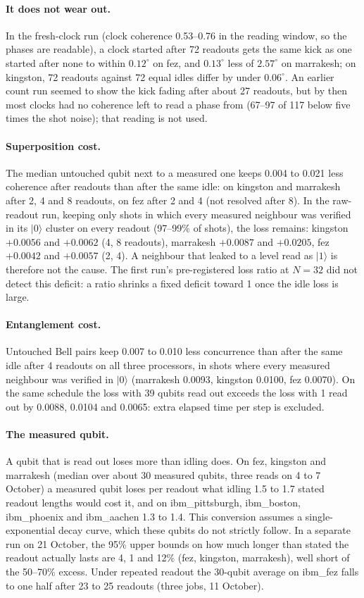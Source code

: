 \documentclass[reprint,amsmath,amssymb,aps,superscriptaddress,nofootinbib]{revtex4-2}
\begin{document}
\paragraph*{It does not wear out.} In the fresh-clock run (clock coherence 0.53--0.76 in the reading window, so the phases are readable), a clock started after 72 readouts gets the same kick as one started after none to within $0.12^\circ$ on fez, and $0.13^\circ$ less of $2.57^\circ$ on marrakesh; on kingston, 72 readouts against 72 equal idles differ by under $0.06^\circ$. An earlier count run seemed to show the kick fading after about 27 readouts, but by then most clocks had no coherence left to read a phase from (67--97 of 117 below five times the shot noise); that reading is not used.

\paragraph*{Superposition cost.} The median untouched qubit next to a measured one keeps 0.004 to 0.021 less coherence after readouts than after the same idle: on kingston and marrakesh after 2, 4 and 8 readouts, on fez after 2 and 4 (not resolved after 8). In the raw-readout run, keeping only shots in which every measured neighbour was verified in its $|0\rangle$ cluster on every readout (97--99\% of shots), the loss remains: kingston $+0.0056$ and $+0.0062$ (4, 8 readouts), marrakesh $+0.0087$ and $+0.0205$, fez $+0.0042$ and $+0.0057$ (2, 4). A neighbour that leaked to a level read as $|1\rangle$ is therefore not the cause. The first run's pre-registered loss ratio at $N=32$ did not detect this deficit: a ratio shrinks a fixed deficit toward 1 once the idle loss is large.

\paragraph*{Entanglement cost.} Untouched Bell pairs keep 0.007 to 0.010 less concurrence than after the same idle after 4 readouts on all three processors, in shots where every measured neighbour was verified in $|0\rangle$ (marrakesh 0.0093, kingston 0.0100, fez 0.0070). On the same schedule the loss with 39 qubits read out exceeds the loss with 1 read out by 0.0088, 0.0104 and 0.0065: extra elapsed time per step is excluded.

\paragraph*{The measured qubit.} A qubit that is read out loses more than idling does. On fez, kingston and marrakesh (median over about 30 measured qubits, three reads on 4 to 7 October) a measured qubit loses per readout what idling 1.5 to 1.7 stated readout lengths would cost it, and on ibm\_pittsburgh, ibm\_boston, ibm\_phoenix and ibm\_aachen 1.3 to 1.4. This conversion assumes a single-exponential decay curve, which these qubits do not strictly follow. In a separate run on 21 October, the 95\% upper bounds on how much longer than stated the readout actually lasts are 4, 1 and 12\% (fez, kingston, marrakesh), well short of the 50--70\% excess. Under repeated readout the 30-qubit average on ibm\_fez falls to one half after 23 to 25 readouts (three jobs, 11 October).
\end{document}
